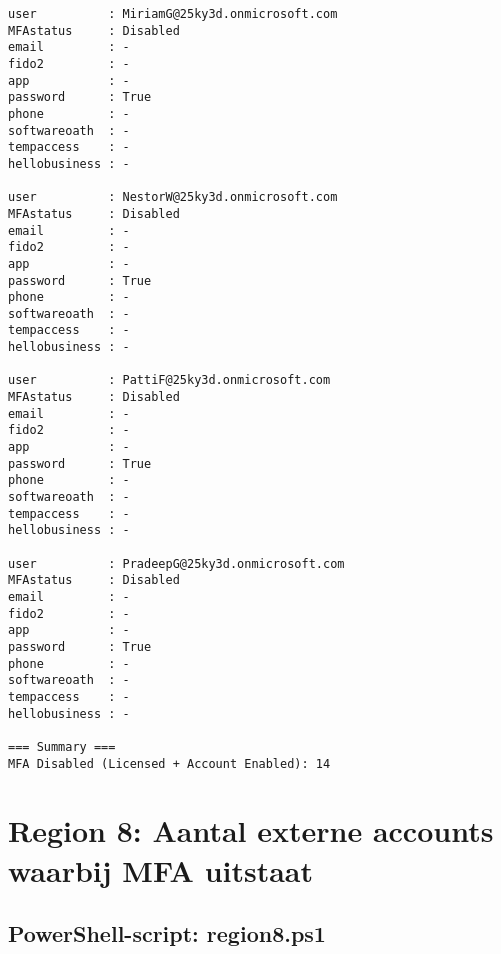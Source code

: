 \begin{tiny}
\begin{verbatim}
user          : MiriamG@25ky3d.onmicrosoft.com
MFAstatus     : Disabled
email         : -
fido2         : -
app           : -
password      : True
phone         : -
softwareoath  : -
tempaccess    : -
hellobusiness : -

user          : NestorW@25ky3d.onmicrosoft.com
MFAstatus     : Disabled
email         : -
fido2         : -
app           : -
password      : True
phone         : -
softwareoath  : -
tempaccess    : -
hellobusiness : -

user          : PattiF@25ky3d.onmicrosoft.com
MFAstatus     : Disabled
email         : -
fido2         : -
app           : -
password      : True
phone         : -
softwareoath  : -
tempaccess    : -
hellobusiness : -

user          : PradeepG@25ky3d.onmicrosoft.com
MFAstatus     : Disabled
email         : -
fido2         : -
app           : -
password      : True
phone         : -
softwareoath  : -
tempaccess    : -
hellobusiness : -

=== Summary ===
MFA Disabled (Licensed + Account Enabled): 14
    \end{verbatim}
\end{tiny}

\clearpage

\section{Region 8: Aantal externe accounts waarbij MFA uitstaat}

\subsection{PowerShell-script: region8.ps1}


